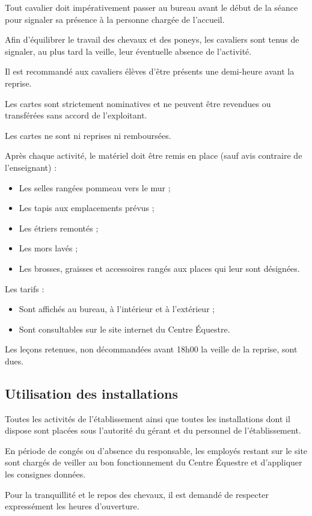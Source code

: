 \documentclass[11pt,a4paper]{article}
\begin{document}
Tout cavalier doit impérativement passer au bureau avant le début de la séance pour signaler sa présence à la personne chargée de l'accueil.

Afin d'équilibrer le travail des chevaux et des poneys, les cavaliers sont tenus de signaler, au plus tard la veille, leur éventuelle absence de l'activité.

Il est recommandé aux cavaliers élèves d'être présents une demi-heure avant la reprise.

Les cartes sont strictement nominatives et ne peuvent être revendues ou transférées sans accord de l'exploitant.

Les cartes ne sont ni reprises ni remboursées.

Après chaque activité, le matériel doit être remis en place (sauf avis contraire de l'enseignant) :
\begin{itemize}[leftmargin=50pt]
	\item
	Les selles rangées pommeau vers le mur ;
	\item
	Les tapis aux emplacements prévus ;
	\item
	Les étriers remontés ;
	\item
	Les mors lavés ;
	\item
	Les brosses, graisses et accessoires rangés aux places qui leur sont désignées.
\end{itemize}

Les tarifs :
\begin{itemize}[leftmargin=50pt]
\item
Sont affichés au bureau, à l'intérieur et à l'extérieur ;
\item
Sont consultables sur le site internet du Centre Équestre.
\end{itemize}

Les leçons retenues, non décommandées avant 18h00 la veille de la reprise, sont dues.

\subsection{Utilisation des installations}\label{subsec:utilisation-des-installations}
Toutes les activités de l'établissement ainsi que toutes les installations dont il dispose sont placées sous l'autorité du gérant et du personnel de l'établissement. \par
En période de congés ou d'absence du responsable, les employés restant sur le site sont chargés de veiller au bon fonctionnement du Centre Équestre et d'appliquer les consignes données. \par
Pour la tranquillité et le repos des chevaux, il est demandé de respecter expressément les heures d'ouverture.
\end{document}
